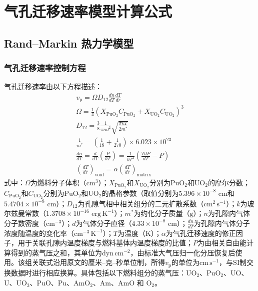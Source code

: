 \chapter{气孔迁移速率模型计算公式}
\label{app:pore_migration_models}

\section{Rand--Markin 热力学模型}

\subsection{气孔迁移速率控制方程}

气孔迁移速率由以下方程描述：
\begin{equation}
	\begin{gathered}
		v_{\mathrm p} = \Omega D_{12} \frac{dn}{dT} \frac{dT}{dr} \\
		\Omega = \frac{1}{4} (X_{\text{PuO}_2} C_{\text{PuO}_2} + X_{\text{UO}_2} C_{\text{UO}_2})^3 \\
		D_{12} = \frac{3}{8} \frac{1}{\pi nd^2} \sqrt{\frac{\pi kT}{2m^*}} \\
		\frac{1}{m^*} = \left( \frac{1}{18} + \frac{1}{270} \right) \times 6.023 \times 10^{23} \\
		\frac{dn}{dT} = \frac{d}{dT} (\frac{P}{kT}) = \frac{1}{kT^2} \left( \frac{TdP}{dT} - P \right) \\
		\left( \frac{dT}{dr} \right)_{\text{void}} = \alpha \left( \frac{dT}{dr} \right)_{\text{matrix}}
	\end{gathered}
	\label{eq:app_b_rand_markin_migration_control}
\end{equation}
\noindent 式中：$\Omega$为燃料分子体积（cm$^3$）；$X_{\text{PuO}_2}$和$X_{\text{UO}_2}$分别为PuO$_2$和UO$_2$的摩尔分数；$C_{\text{PuO}_2}$和$C_{\text{UO}_2}$分别为PuO$_2$和UO$_2$的晶格参数（取值分别为$5.396 \times 10^{-8}$ cm和$5.4704 \times 10^{-8}$ cm）；$D_{12}$为孔隙气相中相关组分的二元扩散系数（$\mathrm{cm^2\,s^{-1}}$）；$k$为玻尔兹曼常数（$1.3708 \times 10^{-16}$ $\mathrm{erg\,K^{-1}}$）；$m^*$为约化分子质量（$\mathrm{g}$）；$n$为孔隙内气体分子数密度（$\mathrm{cm^{-3}}$）；$d$为气体分子直径（$4.33 \times 10^{-8}$ cm）；$\frac{dn}{dT}$为孔隙内气体分子浓度随温度的变化率（$\mathrm{cm^{-3}\,K^{-1}}$）；$T$为温度（K）；$\alpha$为气孔迁移速度的修正因子，用于关联孔隙内温度梯度与燃料基体内温度梯度的比值；$P$为由相关自由能计算得到的蒸气压之和，其单位为$\mathrm{dyn\,cm^{-2}}$，由标准大气压归一化分压恢复后使用。该组关联式沿用原文的厘米--克--秒单位制，所得$v_{\mathrm p}$的单位为$\mathrm{cm\,s^{-1}}$，与SI制交换数据时进行相应换算。具体包括以下燃料组分的蒸气压：UO$_2$、PuO$_2$、UO、U、UO$_3$、PuO、Pu、AmO$_2$、Am、AmO 和 O$_2$。

